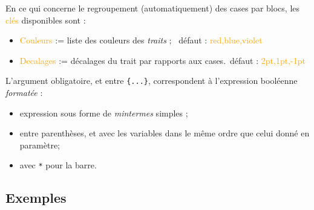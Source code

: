 \documentclass[french,a4paper,11pt]{article}
\newcommand\Cle[1]{{\small\sffamily\textlangle \textcolor{orange}{#1}\textrangle}}
\begin{document}
{{\begin{tipblock}
En ce qui concerne le regroupement (automatiquement) des cases par blocs, les \Cle{clés} disponibles sont :

\begin{itemize}
	\item \Cle{Couleurs} := liste des couleurs des \textit{traits} ; \hfill~défaut : \Cle{red,blue,violet}
	\item \Cle{Decalages} := décalages du trait par rapports aux cases.\hfill~défaut : \Cle{2pt,1pt,-1pt}
\end{itemize}

L'argument obligatoire, et entre \texttt{\{...\}}, correspondent à l'expression booléenne \textit{formatée} :

\begin{itemize}
	\item expression sous forme de \textit{mintermes} simples ;
	\item entre parenthèses, et avec les variables dans le même ordre que celui donné en paramètre;
	\item avec \texttt{*} pour la barre.
\end{itemize}
\vspace*{-\baselineskip}\leavevmode
\end{tipblock}

\subsection{Exemples}

\begin{DemoCode}[]
\begin{TableKarnaugh}
\end{TableKarnaugh}
\hspace{5mm}
\begin{TableKarnaugh}[Aide]
\end{TableKarnaugh}
\hspace{5mm}
\begin{TableKarnaugh}[Swap]
\end{TableKarnaugh}
\end{DemoCode}

}}
\end{document}
